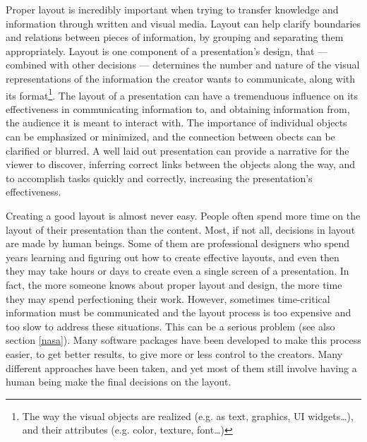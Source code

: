    Proper layout is incredibly important when trying to transfer knowledge and
   information through written and visual media. Layout can help clarify
   boundaries and relations between pieces of information, by grouping and
   separating them appropriately. Layout is one component of a presentation's
   design, that --- combined with other decisions --- determines the number and
   nature of the visual representations of the information the creator wants to
   communicate, along with its format\footnote{The way the visual objects are
   realized (e.g. as text, graphics, UI widgets\ldots), and their attributes
   (e.g. color, texture, font\ldots)}. The layout of a presentation can have a
   tremenduous influence on its effectiveness in communicating information to,
   and obtaining information from, the audience it is meant to interact with.
   The importance of individual objects can be emphasized or minimized, and the
   connection between obects can be clarified or blurred. A well laid out
   presentation can provide a narrative for the viewer to discover, inferring
   correct links between the objects along the way, and to accomplish tasks
   quickly and correctly, increasing the presentation's effectiveness.
  
   Creating a good layout is almost never easy. People often spend more time on
   the layout of their presentation than the content. Most, if not all,
   decisions in layout are made by human beings. Some of them are professional
   designers who spend years learning and figuring out how to create effective
   layouts, and even then they may take hours or days to create even a single
   screen of a presentation. In fact, the more someone knows about proper
   layout and design, the more time they may spend perfectioning their work.
   However, sometimes time-critical information must be communicated and the
   layout process is too expensive and too slow to address these situations.
   This can be a serious problem (see also section \ref{nasa}). Many software
   packages have been developed to make this process easier, to get better
   results, to give more or less control to the creators. Many different
   approaches have been taken, and yet most of them still involve having a
   human being make the final decisions on the layout.

